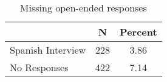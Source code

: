 \begin{table}[ht]
\centering
\caption{Missing open-ended responses} 
\label{tab:app_mis}
\begin{tabular}{lcc}
  \hline
 & N & Percent \\ 
  \hline
Spanish Interview & 228 & 3.86 \\ 
  No Responses & 422 & 7.14 \\ 
   \hline
\end{tabular}
\end{table}
